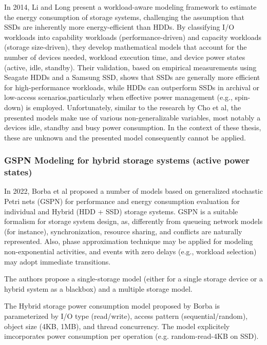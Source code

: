In 2014, Li and Long\parencite{liWhichStorageDevice2014} present a workload-aware modeling framework to estimate the energy consumption of storage systems, challenging the assumption that SSDs are inherently more energy-efficient than HDDs. By classifying I/O workloads into capability workloads (performance-driven) and capacity workloads (storage size-driven), they develop mathematical models that account for the number of devices needed, workload execution time, and device power states (active, idle, standby). Their validation, based on empirical measurements using Seagate HDDs and a Samsung SSD, shows that SSDs are generally more efficient for high-performance workloads, while HDDs can outperform SSDs in archival or low-access scenarios,particularly when effective power management (e.g., spin-down) is employed. Unfortunately, similar to the research by Cho et al, the presented models make use of various non-generalizable variables, most notably a devices idle, standby and busy power consumption. In the context of these thesis, these are unknown and the presented model consequently cannot be applied.

\subsubsection{GSPN Modeling for hybrid storage systems (active power states)}
In 2022, Borba et al\parencite{borbaModelingApproachEstimating2022} proposed a number of models based on generalized stochastic Petri nets (GSPN) for performance and energy consumption evaluation for individual and Hybrid (HDD + SSD) storage systems. GSPN is a suitable formalism for storage system design, as, differently from queueing network models (for instance), synchronization, resource sharing, and conflicts are naturally represented. Also, phase approximation technique may be applied for modeling non-exponential activities, and events with zero delays (e.g., workload selection) may adopt immediate transitions. 

The authors propose a single-storage model (either for a single storage device or a hybrid system as a blackbox) and a multiple storage model.

The Hybrid storage power consumption model proposed by Borba is parameterized by I/O type (read/write), access pattern (sequential/random), object size (4KB, 1MB), and thread concurrency. The model explicitely imcorporates power consumption per operation (e.g. random-read-4KB on SSD).

